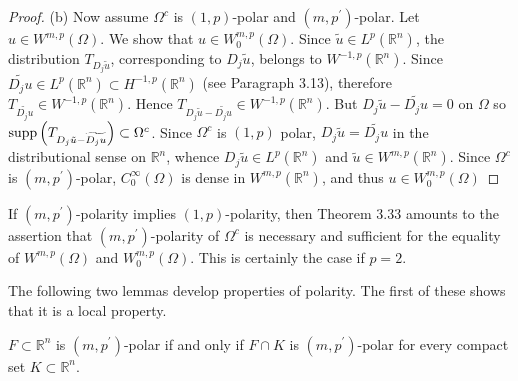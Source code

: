 \begin{proof}
  (b) Now assume $\Omega^c$ is $(1, p)$-polar and $\left(m, p^{\prime}\right)$-polar. Let $u \in W^{m,p}(\Omega)$. We show that $u \in W_0^{m, p}(\Omega)$. Since $\tilde{u} \in L^p\left(\mathbb{R}^n\right)$, the distribution $T_{D_j \tilde{u}}$, corresponding to $D_j \tilde{u}$, belongs to $W^{-1, p}\left(\mathbb{R}^n\right)$. Since $\widetilde{D_j u} \in L^p\left(\mathbb{R}^n\right) \subset H^{-1, p}\left(\mathbb{R}^n\right)$ (see Paragraph 3.13), therefore $T_{\widetilde{D_j u}} \in W^{-1, p}\left(\mathbb{R}^n\right)$. Hence $T_{D_j \tilde{u}-\widetilde{D_j u}} \in W^{-1, p}\left(\mathbb{R}^n\right)$. But $D_j \tilde{u}-\widetilde{D_j u}=0$ on $\Omega$ so $\operatorname{supp}\left(T_{D_j \tilde{u}-\widetilde{D_j u}}\right) \subset \Omega^c$. Since $\Omega^c$ is $(1, p)$ polar, $D_j \tilde{u}=\widetilde{D_j u}$ in the distributional sense on $\mathbb{R}^n$, whence $D_j \tilde{u} \in L^p\left(\mathbb{R}^n\right)$ and $\tilde{u} \in W^{m,p}\left(\mathbb{R}^n\right)$. Since $\Omega^c$ is $\left(m, p^{\prime}\right)$-polar, $C_0^{\infty}(\Omega)$ is dense in $W^{m,p}\left(\mathbb{R}^n\right)$, and thus $u \in W_0^{m, p}(\Omega)$
\end{proof}

\begin{para}
  If $\left(m, p^{\prime}\right)$-polarity implies $(1, p)$-polarity, then Theorem 3.33 amounts to the assertion that $\left(m, p^{\prime}\right)$-polarity of $\Omega^c$ is necessary and sufficient for the equality of $W^{m,p}(\Omega)$ and $W_0^{m, p}(\Omega)$. This is certainly the case if $p=2$.
\end{para}

The following two lemmas develop properties of polarity. The first of these shows that it is a local property.


\begin{lemma}
  $F \subset \mathbb{R}^n$ is $\left(m, p^{\prime}\right)$-polar if and only if $F \cap K$ is $\left(m, p^{\prime}\right)$-polar for every compact set $K \subset \mathbb{R}^n$.
\end{lemma}

